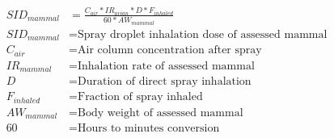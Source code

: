 \documentclass[fleqn, oneside, 11pt]{article}%
\begin{document}
\begin{preview}
\begin{align*}%
SID_{mammal} & = \frac{C_{air}*IR_{avian}*D*F_{inhaled}}{60*AW_{mammal}}\nonumber \\
SID_{mammal} & =  \text{Spray droplet inhalation dose of assessed mammal} \nonumber \\
C_{air} & =  \text{Air column concentration after spray} \nonumber \\
IR_{mammal} & =  \text{Inhalation rate of assessed mammal} \nonumber \\
D & =  \text{Duration of direct spray inhalation} \nonumber \\
F_{inhaled} & =  \text{Fraction of spray inhaled} \nonumber \\
AW_{mammal} & =  \text{Body weight of assessed mammal} \nonumber \\
60 & =  \text{Hours to minutes conversion} \nonumber \\
\end{align*} 
\end{preview}
\end{document}
